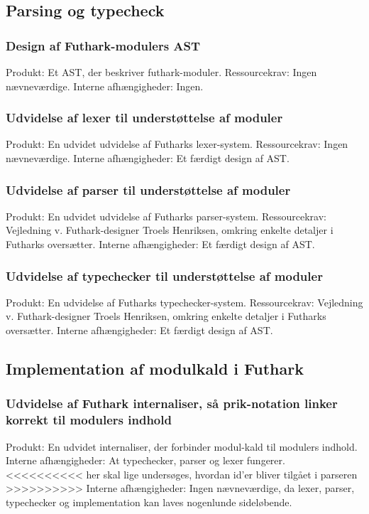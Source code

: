 \documentclass[12pt]{article}
\begin{document}
\subsection{Parsing og typecheck}
\subsubsection{Design af Futhark-modulers AST}
Produkt: Et AST, der beskriver futhark-moduler.
Ressourcekrav: Ingen nævneværdige.
Interne afhængigheder: Ingen.
\subsubsection{Udvidelse af lexer til understøttelse af moduler}
Produkt: En udvidet udvidelse af Futharks lexer-system.
Ressourcekrav: Ingen nævneværdige.
Interne afhængigheder: Et færdigt design af AST.
\subsubsection{Udvidelse af parser til understøttelse af moduler}
Produkt: En udvidet udvidelse af Futharks parser-system.
Ressourcekrav: Vejledning v. Futhark-designer Troels Henriksen, omkring enkelte
detaljer i Futharks oversætter.
Interne afhængigheder: Et færdigt design af AST.
\subsubsection{Udvidelse af typechecker til understøttelse af moduler}
Produkt: En udvidelse af Futharks typechecker-system.
Ressourcekrav: Vejledning v. Futhark-designer Troels Henriksen, omkring enkelte
detaljer i Futharks oversætter.
Interne afhængigheder: Et færdigt design af AST.

\subsection{Implementation af modulkald i Futhark}
\subsubsection{Udvidelse af Futhark internaliser, så prik-notation linker korrekt til
  modulers indhold}
Produkt: En udvidet internaliser, der forbinder modul-kald til modulers indhold.
Interne afhængigheder: At typechecker, parser og lexer fungerer.
<<<<<<<<<< her skal lige undersøges, hvordan id'er bliver tilgået i parseren
>>>>>>>>>>
Interne afhængigheder: Ingen nævneværdige, da lexer, parser, typechecker og
implementation kan laves nogenlunde sideløbende.
\end{document}
